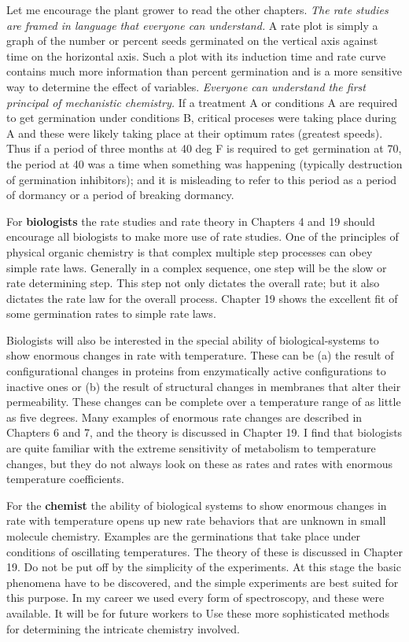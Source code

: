 Let me encourage the plant grower to read the other chapters. \textit{The rate studies
are framed in language that everyone can understand.} A rate plot is simply a graph of
the number or percent seeds germinated on the vertical axis against time on the
horizontal axis. Such a plot with its induction time and rate curve contains much more
information than percent germination and is a more sensitive way to determine the
effect of variables. \textit{Everyone can understand the first principal of mechanistic
chemistry.} If a treatment A or conditions A are required to get germination under
conditions B, critical proceses were taking place during A and these were likely taking
place at their optimum rates (greatest speeds). Thus if a period of three months at 40
deg F is required to get germination at 70, the period at 40 was a time when something
was happening (typically destruction of germination inhibitors); and it is misleading to
refer to this period as a period of dormancy or a period of breaking dormancy.

For \textbf{biologists} the rate studies and rate theory in Chapters 4 and 19 should
encourage all biologists to make more use of rate studies. One of the principles of
physical organic chemistry is that complex multiple step processes can obey simple
rate laws. Generally in a complex sequence, one step will be the slow or rate
determining step. This step not only dictates the overall rate; but it also dictates the
rate law for the overall process. Chapter 19 shows the excellent fit of some
germination rates to simple rate laws.

Biologists will also be interested in the special ability of biological-systems
to show enormous changes in rate with temperature. These can be (a) the result
of configurational changes in proteins from enzymatically active configurations
to inactive ones or (b) the result of structural changes in membranes that
alter their permeability.  These changes can be complete over a temperature
range of as little as five degrees.  Many examples of enormous rate changes are
described in Chapters 6 and 7, and the theory is discussed in Chapter 19. I
find that biologists are quite familiar with the extreme sensitivity of
metabolism to temperature changes, but they do not always look on these as
rates and rates with enormous temperature coefficients.

For the \textbf{chemist} the ability of biological systems to show enormous changes in
rate with temperature opens up new rate behaviors that are unknown in small
molecule chemistry. Examples are the germinations that take place under conditions
of oscillating temperatures. The theory of these is discussed in Chapter 19. Do not be
put off by the simplicity of the experiments. At this stage the basic phenomena have to
be discovered, and the simple experiments are best suited for this purpose. In my
career we used every form of spectroscopy, and these were available. It will be for
future workers to Use these more sophisticated methods for determining the intricate
chemistry involved.


